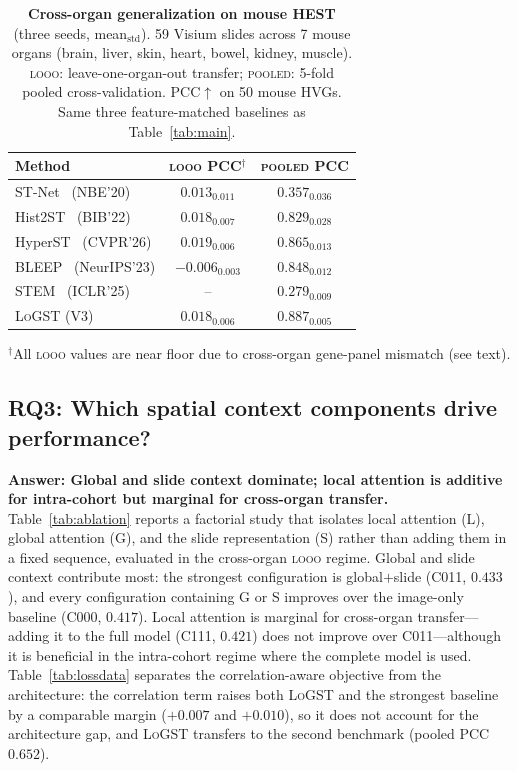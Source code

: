 \documentclass[10pt,twocolumn,letterpaper]{article}
\newcommand{\morph}{\textsc{LoGST}}
\newcommand{\best}[1]{{\bfseries\boldmath #1}}
\begin{document}
\begin{table}[t]
\centering
\caption{\textbf{Cross-organ generalization on mouse HEST} (three seeds, mean$_{\text{std}}$).
59 Visium slides across 7 mouse organs (brain, liver, skin, heart, bowel, kidney, muscle).
\textsc{looo}: leave-one-organ-out transfer; \textsc{pooled}: 5-fold pooled cross-validation.
PCC$\uparrow$ on 50 mouse HVGs. Same three feature-matched baselines as Table~\ref{tab:main}.}
\label{tab:mouse}
\small
\setlength{\tabcolsep}{5pt}
\begin{tabular}{l c c}
\toprule
Method & \textsc{looo} PCC$^\dag$ & \textsc{pooled} PCC \\
\midrule
ST-Net~\cite{he2020stnet} (NBE'20)          & $0.013_{0.011}$ & $0.357_{0.036}$ \\
Hist2ST~\cite{zeng2022hist2st} (BIB'22)     & $0.018_{0.007}$ & $0.829_{0.028}$ \\
HyperST~\cite{zhang2026hyperst} (CVPR'26)   & \best{$0.019_{0.006}$} & $0.865_{0.013}$ \\
BLEEP~\cite{xie2023bleep} (NeurIPS'23)      & $-0.006_{0.003}$ & $0.848_{0.012}$ \\
STEM~\cite{wu2025stem} (ICLR'25)            & -- & $0.279_{0.009}$ \\
\midrule
\morph{} (V3) & $0.018_{0.006}$ & \best{$0.887_{0.005}$} \\
\bottomrule
\end{tabular}
\begin{minipage}{\linewidth}\vspace{2pt}
\scriptsize $^\dag$All \textsc{looo} values are near floor due to
cross-organ gene-panel mismatch (see text).
\end{minipage}
\end{table}

\FloatBarrier
\subsection{RQ3: Which spatial context components drive performance?}
\label{sec:rq3}
\noindent\textbf{Answer: Global and slide context dominate; local attention is additive for intra-cohort but marginal for cross-organ transfer.}
Table~\ref{tab:ablation} reports a factorial study that isolates local attention (L), global attention
(G), and the slide representation (S) rather than adding them in a fixed sequence, evaluated in the
cross-organ \textsc{looo} regime. Global and slide context contribute most: the strongest configuration
is global$+$slide (C011, $0.433$), and every configuration containing G or S improves over the
image-only baseline (C000, $0.417$). Local attention is marginal for cross-organ transfer---adding it
to the full model (C111, $0.421$) does not improve over C011---although it is beneficial in the
intra-cohort regime where the complete model is used. Table~\ref{tab:lossdata} separates the
correlation-aware objective from the architecture: the
correlation term raises both \morph{} and the strongest baseline by a comparable margin ($+0.007$ and
$+0.010$), so it does not account for the architecture gap, and \morph{} transfers to the second
benchmark (pooled PCC $0.652$).
\end{document}
